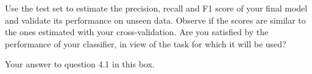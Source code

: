 
\begin{question}{4.1}
Use the test set to estimate the precision, recall and F1 score of your final model and validate its performance on unseen data.
Observe if the scores are similar to the ones estimated with your cross-validation. Are you satisfied by the performance of your classifier, in view of the task for which it will be used? 
\end{question}

\begin{answer}{12} 
    Your answer to question 4.1 in this box.
\end{answer}



